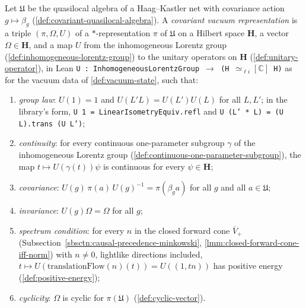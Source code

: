 \begin{definition}
    \label{def:covariant-vacuum-representation}
    \leanok
    Let $\mathfrak{U}$ be the quasilocal algebra of a Haag--Kastler net with covariance action $g \mapsto \beta_g$ (\ref{def:covariant-quasilocal-algebra}). A \emph{covariant vacuum representation} is a triple $(\pi, \Omega, U)$ of a $*$-representation $\pi$ of $\mathfrak{U}$ on a Hilbert space $\mathbf{H}$, a vector $\Omega \in \mathbf{H}$, and a map $U$ from the inhomogeneous Lorentz group (\ref{def:inhomogeneous-lorentz-group}) to the unitary operators on $\mathbf{H}$ (\ref{def:unitary-operator}), in Lean \texttt{U : InhomogeneousLorentzGroup \ensuremath{\to} (H \ensuremath{\simeq_{\ell i}[\mathbb{C}]} H)} as for the vacuum data of \ref{def:vacuum-state}, such that:
    \begin{enumerate}
        \item \emph{group law}: $U(1) = 1$ and $U(L'L) = U(L')U(L)$ for all $L, L'$; in the library's form, \texttt{U 1 = LinearIsometryEquiv.refl} and \texttt{U (L' * L) = (U L).trans (U L')};
        \item \emph{continuity}: for every continuous one-parameter subgroup $\gamma$ of the inhomogeneous Lorentz group (\ref{def:continuous-one-parameter-subgroup}), the map $t \mapsto U(\gamma(t))\psi$ is continuous for every $\psi \in \mathbf{H}$;
        \item \emph{covariance}: $U(g)\,\pi(a)\,U(g)^{-1} = \pi(\beta_g a)$ for all $g$ and all $a \in \mathfrak{U}$;
        \item \emph{invariance}: $U(g)\Omega = \Omega$ for all $g$;
        \item \emph{spectrum condition}: for every $n$ in the closed forward cone $\overline{V}_+$ (Subsection~\ref{sbsctn:causal-precedence-minkowski}, \ref{lmm:closed-forward-cone-iff-norm}) with $n \neq 0$, lightlike directions included, $t \mapsto U(\mathrm{translationFlow}(n)(t)) = U((1, tn))$ has positive energy (\ref{def:positive-energy});
        \item \emph{cyclicity}: $\Omega$ is cyclic for $\pi(\mathfrak{U})$ (\ref{def:cyclic-vector}).
    \end{enumerate}

\end{definition}
